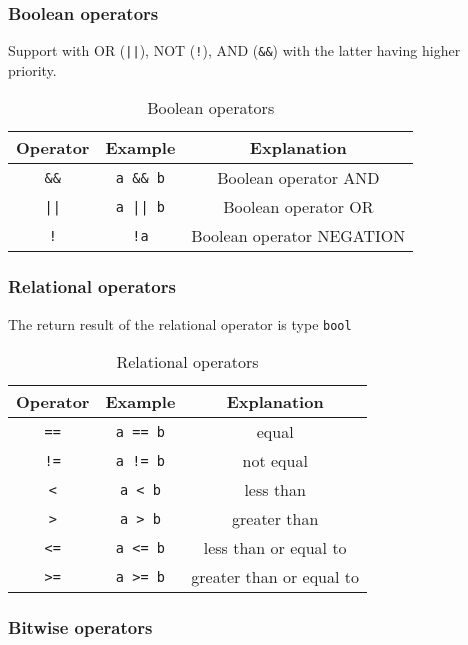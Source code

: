 \subsubsection*{Boolean operators}

Support with OR (\verb!||!), NOT (\verb|!|), AND (\verb|&&|) with the latter having higher priority.

\begin{table}
\centering
\begin{tabular}{c|c|c}
    Operator & Example & Explanation \\ \hline
    \verb|&&| & \verb|a && b| & Boolean operator AND \\
    \verb!||! & \verb!a || b! & Boolean operator OR \\
    \verb|!| & \verb|!a| & Boolean operator NEGATION \\
\end{tabular}
\caption{Boolean operators}
\end{table}

\subsubsection*{Relational operators}

The return result of the relational operator is type \texttt{bool}

\begin{table}
\centering
\begin{tabular}{c|c|c}
    Operator & Example & Explanation \\ \hline
    \verb|==| & \verb|a == b| & equal \\
    \verb|!=| & \verb|a != b| & not equal \\
    \verb|<| & \verb|a < b| & less than \\
    \verb|>| & \verb|a > b| & greater than \\
    \verb|<=| & \verb|a <= b| & less than or equal to \\
    \verb|>=| & \verb|a >= b| & greater than or equal to \\
\end{tabular}
\caption{Relational operators}
\end{table}

\subsubsection*{Bitwise operators}

